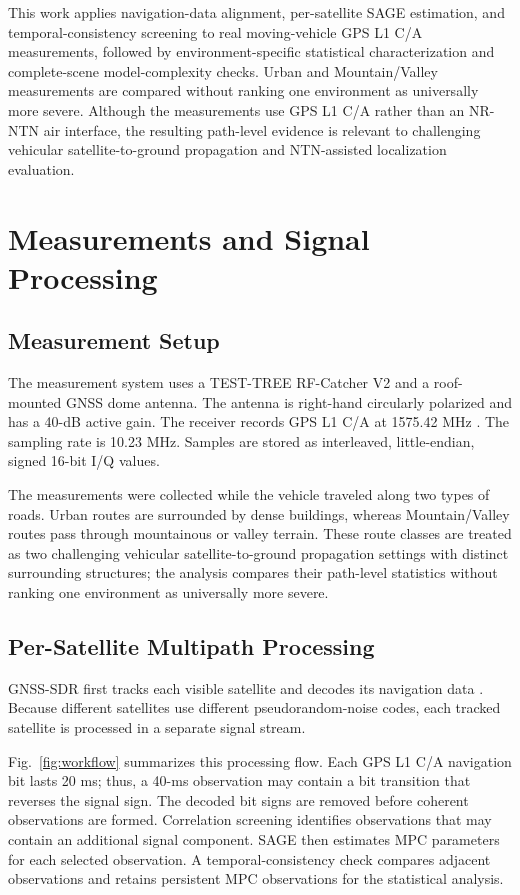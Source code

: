 \documentclass[conference]{IEEEtran}
\begin{document}
This work applies navigation-data alignment, per-satellite SAGE estimation, and temporal-consistency screening to real moving-vehicle GPS L1 C/A measurements, followed by environment-specific statistical characterization and complete-scene model-complexity checks. Urban and Mountain/Valley measurements are compared without ranking one environment as universally more severe. Although the measurements use GPS L1 C/A rather than an NR-NTN air interface, the resulting path-level evidence is relevant to challenging vehicular satellite-to-ground propagation and NTN-assisted localization evaluation.

\section{Measurements and Signal Processing}
\subsection{Measurement Setup}
The measurement system uses a TEST-TREE RF-Catcher V2 and a roof-mounted GNSS dome antenna. The antenna is right-hand circularly polarized and has a 40-dB active gain. The receiver records GPS L1 C/A at 1575.42 MHz \cite{gpsis200n2022}. The sampling rate is 10.23 MHz. Samples are stored as interleaved, little-endian, signed 16-bit I/Q values.

The measurements were collected while the vehicle traveled along two types of roads. Urban routes are surrounded by dense buildings, whereas Mountain/Valley routes pass through mountainous or valley terrain. These route classes are treated as two challenging vehicular satellite-to-ground propagation settings with distinct surrounding structures; the analysis compares their path-level statistics without ranking one environment as universally more severe.

\subsection{Per-Satellite Multipath Processing}
GNSS-SDR first tracks each visible satellite and decodes its navigation data \cite{fernandez2011gnsssdr}. Because different satellites use different pseudorandom-noise codes, each tracked satellite is processed in a separate signal stream.

Fig.~\ref{fig:workflow} summarizes this processing flow. Each GPS L1 C/A navigation bit lasts 20 ms; thus, a 40-ms observation may contain a bit transition that reverses the signal sign. The decoded bit signs are removed before coherent observations are formed. Correlation screening identifies observations that may contain an additional signal component. SAGE then estimates MPC parameters for each selected observation. A temporal-consistency check compares adjacent observations and retains persistent MPC observations for the statistical analysis.
\end{document}
